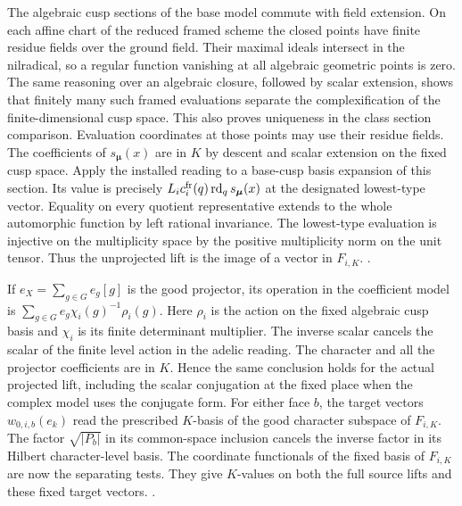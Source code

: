 The algebraic cusp sections of the base model commute with
field extension. On each affine chart of the reduced framed
scheme the closed points have finite residue fields over the
ground field. Their maximal ideals intersect in the
nilradical, so a regular function vanishing at all algebraic
geometric points is zero. The same reasoning over
an algebraic closure, followed by scalar extension, shows
that finitely many such framed evaluations separate the
complexification of the finite-dimensional cusp space. This
also proves uniqueness in the class section comparison.
Evaluation coordinates at those points may use their
residue fields. The coefficients of \(s_{\boldsymbol\mu}(x)\)
are in \(K\) by descent and scalar extension on the fixed
cusp space. Apply the installed reading to a base-cusp basis
expansion of this section. Its value is precisely
\(L_i c_i^{\rm fr}(q)\operatorname{rd}_{q}s_{\boldsymbol\mu}(x)\)
at the designated lowest-type vector. Equality on every
quotient representative extends to the whole automorphic
function by left rational invariance. The lowest-type
evaluation is injective on the multiplicity space by the
positive multiplicity norm on the unit tensor. Thus the
unprojected lift is the image of a vector in \(F_{i,K}\).
.

If \(e_X=\sum_{g\in G} e_g[g]\) is the good projector, its
operation in the coefficient model is
\(\sum_{g\in G}e_g\chi_i(g)^{-1}\rho_i(g)\).
Here \(\rho_i\) is the action on the fixed algebraic cusp basis and
 \(\chi_i\) is its finite determinant multiplier.
The inverse scalar cancels the scalar of the finite level
action in the adelic reading. The character and all the
projector coefficients are in \(K\). Hence the same conclusion
holds for the actual projected lift, including the scalar
conjugation at the fixed place when the complex model uses the
conjugate form. For either face \(b\), the target vectors
\(w_{0,i,b}(e_k)\) read the prescribed \(K\)-basis of the
good character subspace of \(F_{i,K}\). The factor
\(\sqrt{|P_b|}\) in its common-space inclusion cancels the
inverse factor in its Hilbert character-level basis. The
coordinate functionals of the fixed basis of \(F_{i,K}\) are now
the separating tests. They give \(K\)-values on both the
full source lifts and these fixed target vectors.
.

